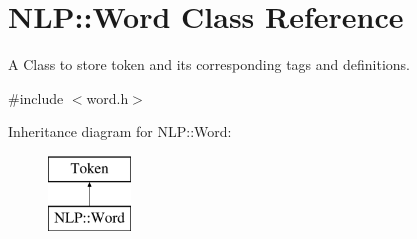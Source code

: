 \hypertarget{classNLP_1_1Word}{\section{N\-L\-P\-:\-:Word Class Reference}
\label{classNLP_1_1Word}
}


A Class to store token and its corresponding tags and definitions.  




{\ttfamily \#include $<$word.\-h$>$}

Inheritance diagram for N\-L\-P\-:\-:Word\-:\begin{figure}[H]
\begin{center}
\leavevmode
\includegraphics[height=2.000000cm]{classNLP_1_1Word}
\end{center}
\end{figure}
